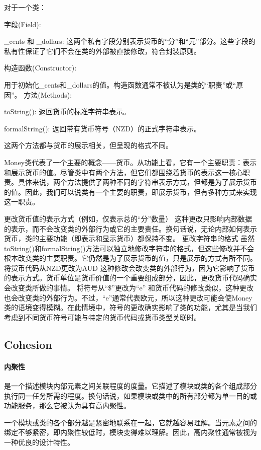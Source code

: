 \documentclass[]{ctexbook}
\begin{document}
对于一个类：

字段(Field):

\_cents 和 \_dollars: 这两个私有字段分别表示货币的“分”和“元”部分。这些字段的私有性保证了它们不会在类的外部被直接修改，符合封装原则。

构造函数(Constructor):

用于初始化\_cents和\_dollars的值。构造函数通常不被认为是类的“职责”或“原因”。
方法(Methods):

toString(): 返回货币的标准字符串表示。

formalString(): 返回带有货币符号（NZD）的正式字符串表示。

这两个方法都与货币的展示相关，但呈现的格式不同。

Money类代表了一个主要的概念——货币。从功能上看，它有一个主要职责：表示和展示货币的值。尽管类中有两个方法，但它们都围绕着货币的表示这一核心职责。具体来说，两个方法提供了两种不同的字符串表示方式，但都是为了展示货币的值。因此，我们可以说类有一个主要的职责，即展示货币，但有多种方式来实现这一职责。

更改货币值的表示方式（例如，仅表示总的“分”数量）
这种更改只影响内部数据的表示，而不会改变类的外部行为或它的主要责任。换句话说，无论内部如何表示货币，类的主要功能（即表示和显示货币）都保持不变。
更改字符串的格式
虽然toString()和formalString()方法可以独立地修改字符串的格式，但这些修改并不会根本改变类的主要职责。它仍然是为了展示货币的值，只是展示的方式有所不同。
将货币代码从NZD更改为AUD
这种修改会改变类的外部行为，因为它影响了货币的表示方式。货币单位是货币价值的一个重要组成部分，因此，更改货币代码确实会改变类所做的事情。
将符号从“\$”更改为“e”
和货币代码的修改类似，这种更改也会改变类的外部行为。不过，“e”通常代表欧元，所以这种更改可能会使Money类的语境变得模糊。在此情境中，符号的更改确实影响了类的功能，尤其是当我们考虑到不同货币符号可能与特定的货币代码或货币类型关联时。

\subsection{Cohesion}
\paragraph{内聚性}是一个描述模块内部元素之间关联程度的度量。它描述了模块或类的各个组成部分执行同一任务所需的程度。换句话说，如果模块或类中的所有部分都为单一目的或功能服务，那么它被认为具有高内聚性。

一个模块或类的各个部分越是紧密地联系在一起，它就越容易理解。当元素之间的绑定不够紧密，即内聚性较低时，模块变得难以理解。因此，高内聚性通常被视为一种优良的设计特性。
\end{document}
